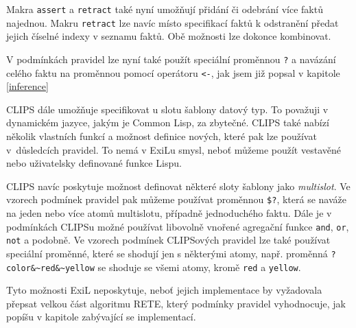 Makra \verb|assert| a \verb|retract| také nyní umožňují přidání či odebrání
více faktů najednou. Makru \verb|retract| lze navíc místo specifikací faktů k
odstranění předat jejich číselné indexy v seznamu faktů. Obě možnosti lze
dokonce kombinovat.

V podmínkách pravidel lze nyní také použít speciální proměnnou \verb|?| a
navázání celého faktu na proměnnou pomocí operátoru \verb|<-|, jak jsem již
popsal v kapitole \ref{inference}

CLIPS dále umožňuje specifikovat u slotu šablony datový typ. To považuji v
dynamickém jazyce, jakým je Common Lisp, za zbytečné. CLIPS také nabízí několik
vlastních funkcí a možnost definice nových, které pak lze používat v~důsledcích
pravidel. To nemá v ExiLu smysl, neboť můžeme použít vestavěné nebo uživatelsky
definované funkce Lispu.

CLIPS navíc poskytuje možnost definovat některé sloty šablony jako
\emph{multislot}. Ve vzorech podmínek pravidel pak můžeme používat proměnnou
\verb|$?|, která se naváže na jeden nebo více atomů multislotu, případně
jednoduchého faktu. Dále je v podmínkách CLIPSu možné používat libovolně vnořené
agregační funkce \verb|and|, \verb|or|, \verb|not| a podobně. Ve vzorech
podmínek CLIPSových pravidel lze také používat speciální proměnné, které se
shodují jen s některými atomy, např. proměnná \verb|?color&~red&~yellow| se
shoduje se všemi atomy, kromě \verb|red| a \verb|yellow|.

Tyto možnosti ExiL neposkytuje, neboť jejich implementace by vyžadovala přepsat
velkou část algoritmu RETE, který podmínky pravidel vyhodnocuje, jak popíšu v
kapitole zabývající se implementací.
